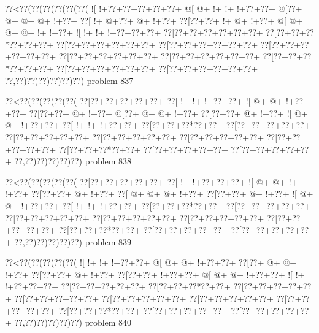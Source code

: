 \vbox{\vbox{\goo
\0??<\0??(\0??(\0??(\0??(\0??(\0??(
\- ![\- !+\0??+\0??+\0??+\0??+\0??+
\- @[\- @+\- !+\- !+\- !+\0??+\0??+
\- @[\0??+\- @+\- @+\- @+\- !+\0??+
\0??[\- !+\- @+\0??+\- @+\- !+\0??+
\0??[\0??+\0??+\- !+\- @+\- !+\0??+
\- @[\- @+\- @+\- @+\- !+\- !+\0??+
\- ![\- !+\- !+\- !+\0??+\0??+\0??+
\0??[\0??+\0??+\0??+\0??+\0??+\0??+
\0??[\0??+\0??+\0??*\0??+\0??+\0??+
\0??[\0??+\0??+\0??+\0??+\0??+\0??+
\0??[\0??+\0??+\0??+\0??+\0??+\0??+
\0??[\0??+\0??+\0??+\0??+\0??+\0??+
\0??[\0??+\0??+\0??+\0??+\0??+\0??+
\0??[\0??+\0??+\0??+\0??+\0??+\0??+
\0??[\0??+\0??+\0??*\0??+\0??+\0??+
\0??[\0??+\0??+\0??+\0??+\0??+\0??+
\0??[\0??+\0??+\0??+\0??+\0??+\0??+
\0??,\0??)\0??)\0??)\0??)\0??)\0??)
}
\hfil problem 837\hfil\break
}

\vbox{\vbox{\goo
\0??<\0??(\0??(\0??(\0??(\0??(
\0??[\0??+\0??+\0??+\0??+\0??+
\0??[\- !+\- !+\- !+\0??+\0??+
\- ![\- @+\- @+\- !+\0??+\0??+
\0??[\0??+\0??+\- @+\- !+\0??+
\- @[\0??+\- @+\- @+\- !+\0??+
\0??[\0??+\0??+\- @+\- !+\0??+
\- ![\- @+\- @+\- !+\0??+\0??+
\0??[\- !+\- !+\- !+\0??+\0??+
\0??[\0??+\0??+\0??*\0??+\0??+
\0??[\0??+\0??+\0??+\0??+\0??+
\0??[\0??+\0??+\0??+\0??+\0??+
\0??[\0??+\0??+\0??+\0??+\0??+
\0??[\0??+\0??+\0??+\0??+\0??+
\0??[\0??+\0??+\0??+\0??+\0??+
\0??[\0??+\0??+\0??*\0??+\0??+
\0??[\0??+\0??+\0??+\0??+\0??+
\0??[\0??+\0??+\0??+\0??+\0??+
\0??,\0??)\0??)\0??)\0??)\0??)
}
\hfil problem 838\hfil\break
}

\vbox{\vbox{\goo
\0??<\0??(\0??(\0??(\0??(\0??(
\0??[\0??+\0??+\0??+\0??+\0??+
\0??[\- !+\- !+\0??+\0??+\0??+
\- ![\- @+\- @+\- !+\- !+\0??+
\0??[\0??+\0??+\- @+\- !+\0??+
\0??[\- @+\- @+\- @+\- !+\0??+
\0??[\0??+\0??+\- @+\- !+\0??+
\- ![\- @+\- @+\- !+\0??+\0??+
\0??[\- !+\- !+\- !+\0??+\0??+
\0??[\0??+\0??+\0??*\0??+\0??+
\0??[\0??+\0??+\0??+\0??+\0??+
\0??[\0??+\0??+\0??+\0??+\0??+
\0??[\0??+\0??+\0??+\0??+\0??+
\0??[\0??+\0??+\0??+\0??+\0??+
\0??[\0??+\0??+\0??+\0??+\0??+
\0??[\0??+\0??+\0??*\0??+\0??+
\0??[\0??+\0??+\0??+\0??+\0??+
\0??[\0??+\0??+\0??+\0??+\0??+
\0??,\0??)\0??)\0??)\0??)\0??)
}
\hfil problem 839\hfil\break
}

\vbox{\vbox{\goo
\0??<\0??(\0??(\0??(\0??(\0??(
\- ![\- !+\- !+\- !+\0??+\0??+
\- @[\- @+\- @+\- !+\0??+\0??+
\0??[\0??+\- @+\- @+\- !+\0??+
\0??[\0??+\0??+\- @+\- !+\0??+
\0??[\0??+\0??+\- !+\0??+\0??+
\- @[\- @+\- @+\- !+\0??+\0??+
\- ![\- !+\- !+\0??+\0??+\0??+
\0??[\0??+\0??+\0??+\0??+\0??+
\0??[\0??+\0??+\0??*\0??+\0??+
\0??[\0??+\0??+\0??+\0??+\0??+
\0??[\0??+\0??+\0??+\0??+\0??+
\0??[\0??+\0??+\0??+\0??+\0??+
\0??[\0??+\0??+\0??+\0??+\0??+
\0??[\0??+\0??+\0??+\0??+\0??+
\0??[\0??+\0??+\0??*\0??+\0??+
\0??[\0??+\0??+\0??+\0??+\0??+
\0??[\0??+\0??+\0??+\0??+\0??+
\0??,\0??)\0??)\0??)\0??)\0??)
}
\hfil problem 840\hfil\break
}

